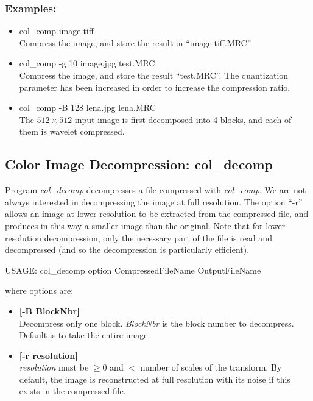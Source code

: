 \subsubsection*{Examples:}
\begin{itemize}
\baselineskip=0.4truecm
\itemsep=0.1truecm
\item col\_comp image.tiff \\
Compress the image, and store the result in ``image.tiff.MRC''
\item col\_comp -g 10 image.jpg  test.MRC \\
Compress the image, and store the result ``test.MRC''. The quantization
parameter has been increased in order to increase the compression ratio.
\item col\_comp -B 128 lena.jpg  lena.MRC \\
The $512 \times 512$ input image is first decomposed into 4 
blocks, and each of them
is wavelet compressed.
\end{itemize}

\subsection{Color Image Decompression: col\_decomp}
Program {\em col\_decomp} decompresses a file compressed with {\em col\_comp}.
We are not always interested in decompressing the image at full resolution. 
The option ``-r'' allows an image at lower resolution to be extracted from 
the compressed file, and produces in this way 
a smaller image than the original. 
Note that for lower resolution decompression, only the necessary part of the
file is read and decompressed (and so the decompression is particularly 
efficient).   
 
{\bf
\begin{center}
 USAGE: col\_decomp option CompressedFileName OutputFileName
\end{center}}
where options are:
\begin{itemize}
\baselineskip=0.4truecm
\item {\bf [-B BlockNbr]} \\
Decompress only one block. {\em BlockNbr} is the block number to decompress.
Default is to take the entire image.
\item {\bf [-r resolution]} \\
{\em resolution} must be $ \geq 0$ and $<$ number of scales of the transform.
By default, the image is reconstructed at full resolution with its noise 
if this exists in the compressed file.
\end{itemize}

